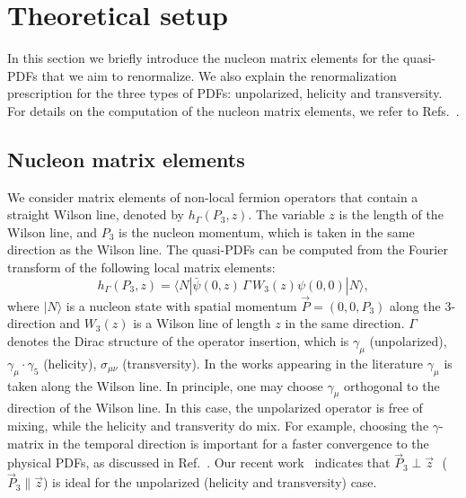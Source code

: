 \section{Theoretical setup}

In this section we briefly introduce the nucleon matrix elements for the quasi-PDFs that we aim to renormalize.
We also explain the renormalization prescription for the three types of PDFs: unpolarized, helicity and transversity.
For details on the computation of the nucleon matrix elements, we refer to Refs.~\cite{Alexandrou:2015rja,Alexandrou:2016jqi}.

\vspace*{0.25cm}
\subsection{Nucleon matrix elements}
\vspace*{0.15cm}

We consider matrix elements of non-local fermion operators that contain a straight Wilson line, denoted by
$h_\Gamma(P_3,z)$. The variable $z$ is the length of the Wilson line, and $P_3$ is the nucleon momentum,
which is taken in the same direction as the Wilson line.
The quasi-PDFs can be computed from the Fourier transform of the following local matrix elements:
\begin{equation}
\label{MElements}
h_\Gamma(P_3,z)=\langle N |\bar{\psi}(0,z)\,\Gamma \,W_3(z) \psi(0,0) |N\rangle,
\end{equation}
where $|N\rangle$ is a nucleon state with spatial momentum $\vec{P}{=}(0,0,P_3)$ along the $3$-direction and
$W_3(z)$ is a Wilson line of length $z$ in the same direction. $\Gamma$ denotes the Dirac structure of the
operator insertion, which is $\gamma_\mu$ (unpolarized), $\gamma_\mu\cdot\gamma_5$ (helicity), $\sigma_{\mu \nu}$
(transversity). In the works appearing in the literature $\gamma_\mu$ is taken along the Wilson line. In principle, one may
choose $\gamma_\mu$ orthogonal to the direction of the Wilson line.  In this case, the unpolarized operator is
free of mixing, while the helicity and transverity do mix. For example, choosing the $\gamma$-matrix in the temporal direction
is important for a faster convergence to the physical PDFs, as discussed in Ref.~\cite{Radyushkin:2016hsy}. Our recent
work~\cite{Constantinou:2017sej} indicates that $\vec P_3 {\perp} \vec z$ \,\,($\vec P_3 {\parallel} \vec z$) is ideal for
the unpolarized (helicity and transversity) case.

